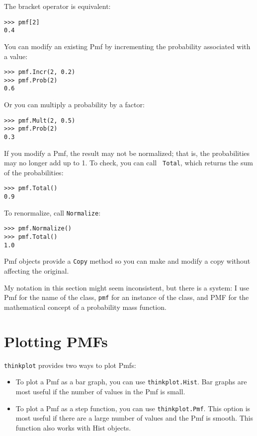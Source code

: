 \documentclass[12pt]{book}
\begin{document}
The bracket operator is equivalent:

\begin{verbatim}
>>> pmf[2]
0.4
\end{verbatim}

You can modify an existing Pmf by incrementing the probability
associated with a value:
%
\begin{verbatim}
>>> pmf.Incr(2, 0.2)
>>> pmf.Prob(2)
0.6
\end{verbatim}

Or you can multiply a probability by a factor:
%
\begin{verbatim}
>>> pmf.Mult(2, 0.5)
>>> pmf.Prob(2)
0.3
\end{verbatim}

If you modify a Pmf, the result may not be normalized; that is, the
probabilities may no longer add up to 1.  To check, you can call {\tt
  Total}, which returns the sum of the probabilities:
%
\begin{verbatim}
>>> pmf.Total()
0.9
\end{verbatim}

To renormalize, call {\tt Normalize}:
%
\begin{verbatim}
>>> pmf.Normalize()
>>> pmf.Total()
1.0
\end{verbatim}

Pmf objects provide a {\tt Copy} method so you can make
and modify a copy without affecting the original.

My notation in this section might seem inconsistent, but there is a
system: I use Pmf for the name of the class, {\tt pmf} for an instance
of the class, and PMF for the mathematical concept of a
probability mass function.


\section{Plotting PMFs}

{\tt thinkplot} provides two ways to plot Pmfs:

\begin{itemize}

\item To plot a Pmf as a bar graph, you can use 
{\tt thinkplot.Hist}.  Bar graphs are most useful if the number
of values in the Pmf is small.

\item To plot a Pmf as a step function, you can use
{\tt thinkplot.Pmf}.  This option is most useful if there are
a large number of values and the Pmf is smooth.  This function
also works with Hist objects.

\end{itemize}
\end{document}
